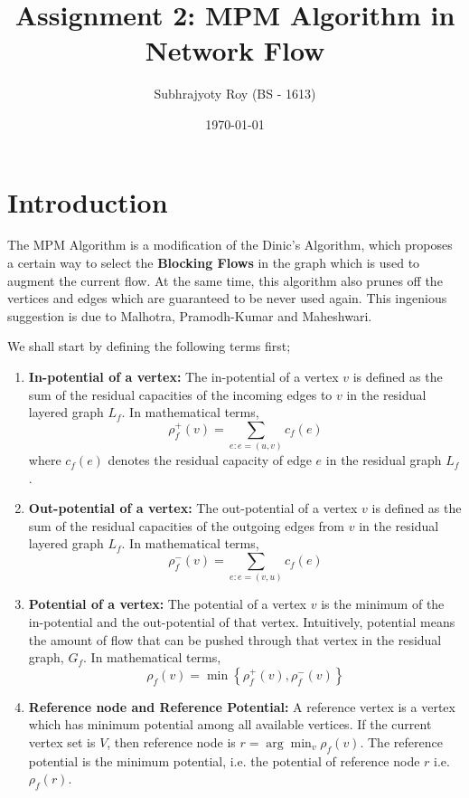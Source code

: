 \documentclass[12pt]{article}
\begin{document}
 

\title{Assignment 2: MPM Algorithm in Network Flow}
\author{Subhrajyoty Roy (BS - 1613)}
\date{\today}
\maketitle
 

\section{Introduction}
\quad The MPM Algorithm is a modification of the Dinic's Algorithm, which proposes a certain way to select the \textbf{Blocking Flows} in the graph which is used to augment the current flow. At the same time, this algorithm also prunes off the vertices and edges which are guaranteed to be never used again. This ingenious suggestion is due to Malhotra, Pramodh-Kumar and Maheshwari.\par 
We shall start by defining the following terms first;
\begin{enumerate}
	\item \textbf{In-potential of a vertex:} The in-potential of a vertex $v$ is defined as the sum of the residual capacities of the incoming edges to $v$ in the residual layered graph $L_f$. In mathematical terms,
	$$\rho_f^+(v) = \sum_{e: e=(u,v)}c_f(e)$$
	where $c_f(e)$ denotes the residual capacity of edge $e$ in the residual graph $L_f$.
	\item \textbf{Out-potential of a vertex:} The out-potential of a vertex $v$ is defined as the sum of the residual capacities of the outgoing edges from $v$ in the residual layered graph $L_f$. In mathematical terms,
	$$\rho_f^-(v) = \sum_{e: e=(v,u)}c_f(e)$$
	\item \textbf{Potential of a vertex:} The potential of a vertex $v$ is the minimum of the in-potential and the out-potential of that vertex. Intuitively, potential means the amount of flow that can be pushed through that vertex in the residual graph, $G_f$. In mathematical terms,
	$$\rho_f(v) = \min\left\{ \rho_f^+(v), \rho_f^-(v) \right\}$$
	\item \textbf{Reference node and Reference Potential:} A reference vertex is a vertex which has minimum potential among all available vertices. If the current vertex set is $V$, then reference node is $r = \arg\min_{v} \rho_f(v)$. The reference potential is the minimum potential, i.e. the potential of reference node $r$ i.e. $\rho_f(r)$. 
\end{enumerate}
\end{document}
